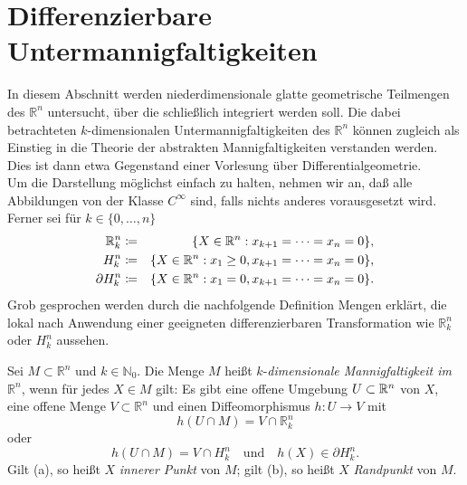 \documentclass[a4paper,twoside,DIV15,BCOR12mm]{scrbook}
\begin{document}
\section{Differenzierbare Untermannigfaltigkeiten}


In diesem Abschnitt werden niederdimensionale glatte geometrische Teilmengen 
des ${\mathbb R}^{n}$ untersucht, über die schließlich integriert 
werden soll. Die dabei betrachteten $k$-dimensionalen 
Untermannigfaltigkeiten des ${\mathbb R}^{n}$ können zugleich als 
Einstieg in die Theorie der abstrakten Mannigfaltigkeiten verstanden werden. 
Dies ist dann etwa Gegenstand einer Vorlesung über Differentialgeometrie.\\

\noindent
Um die Darstellung möglichst einfach zu halten, nehmen wir an, daß 
alle Abbildungen von der Klasse $C^{\infty}$ sind, falls nichts 
anderes vorausgesetzt wird. Ferner sei für $k \in \{0,\dots,n\}$
\begin{eqnarray*}
{\mathbb R}^{n}_{k} & \da  & \{X \in {\mathbb R}^{n}: x_{k+1} = \dots = 
x_{n} = 0\}, \\
H_{k}^{n} & \da  & \{X \in {\mathbb R}^{n}: x_{1} \ge 0, x_{k+1} = 
\dots = x_{n} = 0\}, \\
\partial H^{n}_k & \da  & \{X \in {\mathbb R}^{n}:x_{1} = 0, x_{k+1} = 
\dots = x_{n} = 0\}.
\end{eqnarray*}
Grob gesprochen werden durch die nachfolgende Definition Mengen 
erklärt, die lokal nach Anwendung einer geeigneten differenzierbaren 
Transformation wie ${\mathbb R}_{k}^{n}$ oder $H_{k}^{n}$ aussehen.

\bigskip

 Sei $M \subset {\mathbb R}^{n}$ und $k 
\in {\mathbb N}_{0}$. Die Menge $M$ heißt $k$-{\em dimensionale 
Mannigfaltigkeit im} ${\mathbb R}^{n}$, 
wenn für jedes $X \in M$ 
gilt: Es gibt eine offene Umgebung $U\subset \mathbb{R}^n$ von $X$, eine offene Menge $V 
\subset {\mathbb R}^{n}$ und einen Diffeomorphismus $h: U \to V$ mit
\begin{equation}\label{(a)}
 h(U \cap M) = V \cap {\mathbb R}_{k}^{n}\tag{a}
\end{equation}
oder
\begin{equation}%
h(U \cap M) = V \cap H_{k}^{n}\quad\text{und}\quad h(X)\in\partial H^n_k.\tag{b}
\end{equation}
Gilt (a), so heißt $X$ {\em innerer Punkt} von $M$; gilt (b), so 
heißt $X$ {\em Randpunkt} von $M$.
\end{document}
